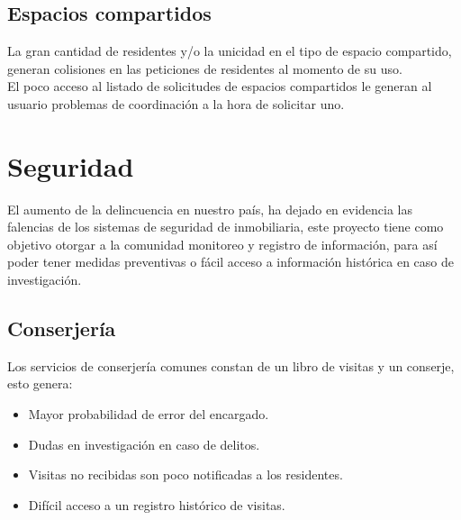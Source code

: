 \subsection{Espacios compartidos}
La gran cantidad de residentes y/o la unicidad en el tipo de espacio compartido, generan colisiones en las peticiones de residentes al momento de su uso.\\
El poco acceso al listado de solicitudes de espacios compartidos le generan al usuario problemas de coordinación a la hora de solicitar uno.
\section{Seguridad}
El aumento de la delincuencia en nuestro país, ha dejado en evidencia las falencias de los sistemas de seguridad de inmobiliaria, este proyecto tiene como objetivo otorgar a la comunidad monitoreo y registro de información, para así poder tener medidas preventivas o fácil acceso a información histórica en caso de investigación.\\ 
\subsection{Conserjería}
Los servicios de conserjería comunes constan de un libro de visitas y un conserje, esto genera:
\begin{itemize}
	\item Mayor probabilidad de error del encargado.
	\item Dudas en investigación en caso de delitos.
	\item Visitas no recibidas son poco notificadas a los residentes.
	\item Difícil acceso a un registro histórico de visitas.
\end{itemize} 
